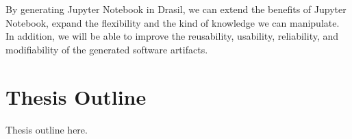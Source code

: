 By generating Jupyter Notebook in Drasil, we can extend the benefits of Jupyter 
Notebook, expand the flexibility and the kind of knowledge we can manipulate. 
In addition, we will be able to improve the reusability, usability, 
reliability, and modifiability of the generated software artifacts. 

\section{Thesis Outline}
Thesis outline here.